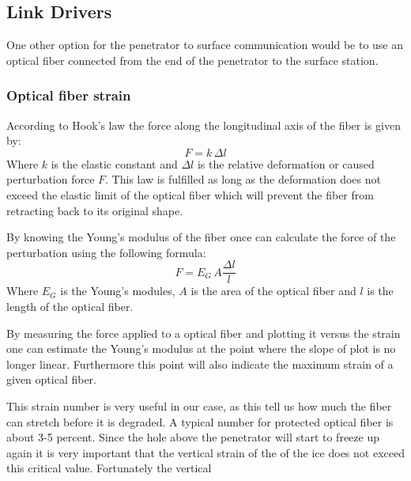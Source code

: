 \subsection{Link Drivers}


One other option for the penetrator to surface communication would be to use an optical fiber connected from the end of the penetrator to the surface station.

\subsubsection{Optical fiber strain}

According to Hook's law the force along the longitudinal axis of the fiber is given by:
\begin{equation}
	 F = k \, \Delta l
\end{equation}
Where $k$ is the elastic constant and $\Delta l$ is the relative deformation or caused perturbation force $F$. This law is fulfilled as long as the deformation does not exceed the elastic limit of the optical fiber which will prevent the fiber from retracting back to its original shape.

By knowing the Young's modulus of the fiber once can calculate the force of the perturbation using the following formula:
\begin{equation}
	F = E_G \, A \frac{\Delta l}{l}
\end{equation}
Where $E_G$ is the Young's modules, $A$ is the area of the optical fiber and $l$ is the length of the optical fiber.

By measuring the force applied to a optical fiber and plotting it versus the strain one can estimate the Young's modulus at the point where the slope of plot is no longer linear. Furthermore this point will also indicate the maximum strain of a given optical fiber.

This strain number is very useful in our case, as this tell us how much the fiber can stretch before it is degraded. A typical number for protected optical fiber is about 3-5 percent\cite{article:optical_fiber_properties,article:optical_fiber_mechanical}. Since the hole above the penetrator will start to freeze up again it is very important that the vertical strain of the of the ice does not exceed this critical value. Fortunately the vertical 

